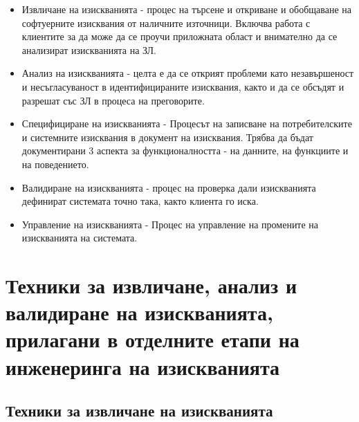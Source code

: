\documentclass[fleqn,12pt]{article}
\begin{document}
\begin{itemize}
	\item Извличане на изискванията - процес на търсене и откриване и обобщаване на софтуерните изисквания от наличните източници. Включва работа с клиентите за да може да се проучи приложната област и внимателно да се анализират изискванията на ЗЛ.
	\item Анализ на изискванията - целта е да се открият проблеми като незавършеност и несъгласуваност в идентифицираните изисквания, както и да се обсъдят и разрешат със ЗЛ в процеса на преговорите.
	\item Специфициране на изискванията - Процесът на записване на потребителските и системните изисквания в документ на изисквания. Трябва да бъдат документирани 3 аспекта за функционалността - на данните, на функциите и на поведението.
	\item Валидиране на изискванията - процес на проверка дали изискванията дефинират системата точно така, както клиента го иска.
	\item Управление на изискванията - Процес на управление на промените на изискванията на системата.
\end{itemize}

\section{Техники за извличане, анализ и валидиране на изискванията, прилагани в отделните етапи на инженеринга на изискванията}

\subsection{Техники за извличане на изискванията}
\end{document}
